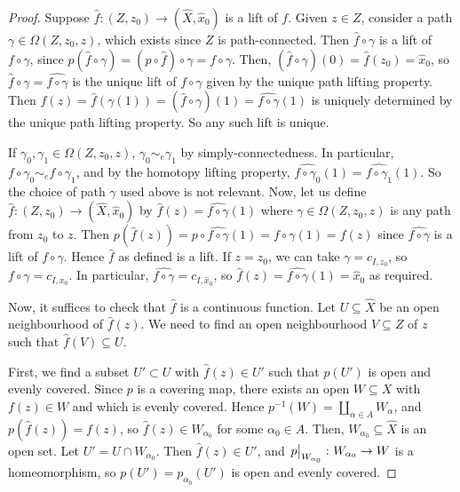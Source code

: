 \begin{proof}
	Suppose \( \hat f \colon (Z,z_0) \to (\hat X, \hat x_0) \) is a lift of \( f \).
	Given \( z \in Z \), consider a path \( \gamma \in \Omega(Z,z_0,z) \), which exists since \( Z \) is path-connected.
	Then \( \hat f \circ \gamma \) is a lift of \( f \circ \gamma \), since \( p(\hat f \circ \gamma) = (p \circ \hat f)\circ \gamma = f \circ \gamma \).
	Then, \( (\hat f \circ \gamma)(0) = \hat f(z_0) = \hat x_0 \), so \( \hat f \circ \gamma = \widehat{f \circ \gamma} \) is the unique lift of \( f \circ \gamma \) given by the unique path lifting property.
	Then \( \hat f(z) = \hat f(\gamma(1)) = (\hat f \circ \gamma)(1) = \widehat{f \circ \gamma}(1) \) is uniquely determined by the unique path lifting property.
	So any such lift is unique.

	If \( \gamma_0, \gamma_1 \in \Omega(Z,z_0,z) \), \( \gamma_0 \sim_e \gamma_1 \) by simply-connectedness.
	In particular, \( f \circ \gamma_0 \sim_e f \circ \gamma_1 \), and by the homotopy lifting property, \( \widehat{f \circ \gamma_0}(1) = \widehat{f \circ \gamma_1}(1) \).
	So the choice of path \( \gamma \) used above is not relevant.
	Now, let us define \( \hat f \colon (Z,z_0) \to (\hat X, \hat x_0) \) by \( \hat f(z) = \widehat{f \circ \gamma}(1) \) where \( \gamma \in \Omega(Z,z_0,z) \) is any path from \( z_0 \) to \( z \).
	Then \( p(\hat f(z)) = p \circ \widehat{f \circ \gamma}(1) = f \circ \gamma(1) = f(z) \) since \( \widehat{f \circ \gamma} \) is a lift of \( f \circ \gamma \).
	Hence \( \hat f \) as defined is a lift.
	If \( z = z_0 \), we can take \( \gamma = c_{I,z_0} \), so \( f \circ \gamma = c_{I,x_0} \).
	In particular, \( \widehat{f \circ \gamma} = c_{I,\hat x_0} \), so \( \hat f(z) = \widehat{f \circ \gamma}(1) = \hat x_0 \) as required.

	Now, it suffices to check that \( \hat f \) is a continuous function.
	Let \( U \subseteq \hat X \) be an open neighbourhood of \( \hat f(z) \).
	We need to find an open neighbourhood \( V \subseteq Z \) of \( z \) such that \( \hat f(V) \subseteq U \).

	First, we find a subset \( U' \subset U \) with \( \hat f(z) \in U' \) such that \( p(U') \) is open and evenly covered.
	Since \( p \) is a covering map, there exists an open \( W \subseteq X \) with \( f(z) \in W \) and which is evenly covered.
	Hence \( p^{-1}(W) = \coprod_{\alpha \in A} W_\alpha \), and \( p(\hat f(z)) = f(z) \), so \( \hat f(z) \in W_{\alpha_0} \) for some \( \alpha_0 \in A \).
	Then, \( W_{\alpha_0} \subseteq \hat X \) is an open set.
	Let \( U' = U \cap W_{\alpha_0} \).
	Then \( \hat f(z) \in U' \), and \( \eval{p}_{W_{\alpha_0}} \colon W_{\alpha_0} \to W \) is a homeomorphism, so \( p(U') = p_{\alpha_0}(U') \) is open and evenly covered.


\end{proof}
